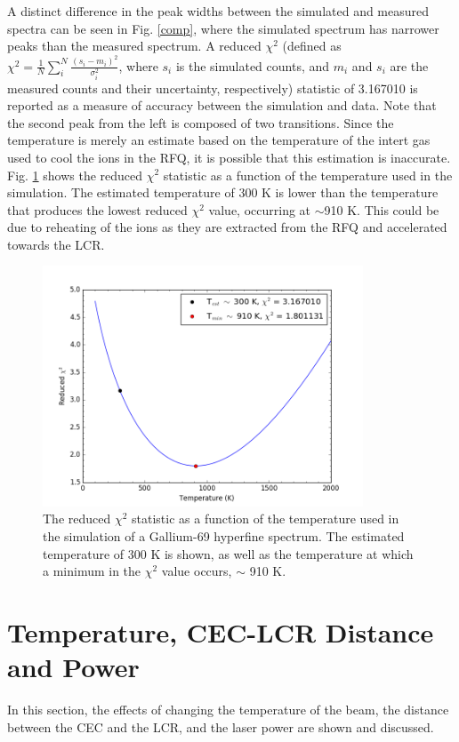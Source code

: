 A distinct difference in the peak widths between the simulated and measured spectra can be seen in Fig. \ref{comp}, where the simulated spectrum has narrower peaks than the measured spectrum. A reduced $\chi^2$ (defined as $\chi^2 = \frac{1}{N}\sum_i^N \frac{(s_i-m_i)^2}{\sigma_i^2}$, where $s_i$ is the simulated counts, and $m_i$ and $s_i$ are the measured counts and their uncertainty, respectively) statistic of 3.167010 is reported as a measure of accuracy between the simulation and data. Note that the second peak from the left is composed of two transitions. Since the temperature is merely an estimate based on the temperature of the intert gas used to cool the ions in the RFQ, it is possible that this estimation is inaccurate. Fig. \ref{chi_temp} shows the reduced $\chi^2$ statistic  as a function of the temperature used in the simulation. The estimated temperature of 300 K is lower than the temperature that produces the lowest reduced $\chi^2$ value, occurring at $\sim$910 K. This could be due to reheating of the ions as they are extracted from the RFQ and accelerated towards the LCR. 
\begin{figure}[h]
\centering
\includegraphics[width=0.85\textwidth]{Graphics/temp_chi.png}
\caption[Reduced $\chi^2$ statistic as a function of the temperature used in the simulation of a Gallium-69 hyperfine spectrum.]{\small The reduced $\chi^2$ statistic as a function of the temperature used in the simulation of a Gallium-69 hyperfine spectrum. The estimated temperature of 300 K is shown, as well as the temperature at which a minimum in the $\chi^2$ value occurs, $\sim$ 910 K.}
\label{chi_temp}
\end{figure}
\section{Temperature, CEC-LCR Distance and Power}
\label{Par_stress}
In this section, the effects of changing the temperature of the beam, the distance between the CEC and the LCR, and  the laser power  are shown and discussed. 

